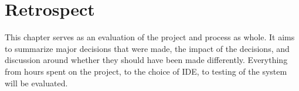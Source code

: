 \chapter{Retrospect}
This chapter serves as an evaluation of the project and process as whole. It aims to summarize major decisions that were made, the impact of the decisions, and discussion around whether they should have been made differently. Everything from hours spent on the project, to the choice of IDE, to testing of the system will be evaluated.






